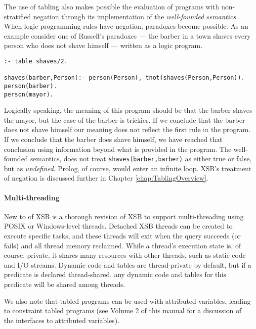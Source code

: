 \begin{example} \label{ex:Russell}
The use of tabling also makes possible the evaluation of programs with
non-stratified negation through its implementation of the {\em
well-founded semantics} \cite{VGRS91}.  When logic programming rules
have negation, paradoxes become possible.  As an example consider one
of Russell's paradoxes --- 
the barber in a town shaves every person who does not shave himself ---
written as a logic program.
\begin{center}
\begin{verbatim} 
:- table shaves/2.

shaves(barber,Person):- person(Person), tnot(shaves(Person,Person)).
person(barber).
person(mayor).
\end{verbatim} 
\end{center}
Logically speaking, the meaning of this program should be that the
barber shaves 
the mayor, but the case of the barber is trickier.  If we conclude
that the barber does not shave himself our meaning does not reflect the 
first rule in the program.  If we conclude that the barber does shave
himself, we have reached that conclusion using information beyond what 
is provided in the program.  The well-founded semantics, does not
treat {\tt shaves(barber,barber)} as either true or false, but as {\em
undefined}. 
Prolog, of course, would enter an infinite loop.  XSB's treatment of
negation is discussed further in Chapter \ref{chap:TablingOverview}.
\end{example}

\paragraph{Multi-threading} New to \version{} of XSB is a thorough
revision of XSB to support multi-threading using POSIX or
Windows-level threads.  Detached XSB threads can be created to execute
specific tasks, and these threads will exit when the query succeeds
(or fails) and all thread memory reclaimed.  While a thread's
execution state is, of course, private, it shares many resources with
other threads, such as static code and I/O streams.  Dynamic code and
tables are thread-private by default, but if a predicate is declared
thread-shared, any dynamic code and tables for this predicate will be
shared among threads.

We also note that tabled programs can be used with attributed
variables, leading to constraint tabled programs (see Volume 2 of this
manual for a discussion of the interfaces to attributed variables).

